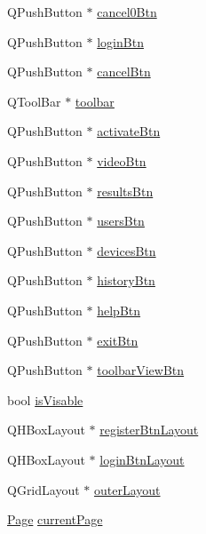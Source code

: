\begin{DoxyCompactItemize}
Q\-Push\-Button $\ast$ \hyperlink{class_master_gui_a591bdee9c01349808ce30a1f1478b99f}{cancel0\-Btn}
\item 
Q\-Push\-Button $\ast$ \hyperlink{class_master_gui_a5bc5b77413591b0b8fb9021062982ca3}{login\-Btn}
\item 
Q\-Push\-Button $\ast$ \hyperlink{class_master_gui_a9203da9daf3fa1294c744bc7fa645115}{cancel\-Btn}
\item 
Q\-Tool\-Bar $\ast$ \hyperlink{class_master_gui_a6851c8e7db4c00bf92b68e10409972f2}{toolbar}
\item 
Q\-Push\-Button $\ast$ \hyperlink{class_master_gui_a0916c489aa00b9e79a617ada5f2339b9}{activate\-Btn}
\item 
Q\-Push\-Button $\ast$ \hyperlink{class_master_gui_ab9232b4e6cf41eec9f72fbd2157b231d}{video\-Btn}
\item 
Q\-Push\-Button $\ast$ \hyperlink{class_master_gui_a09730feb7f21ecd4f3b279056afdb429}{results\-Btn}
\item 
Q\-Push\-Button $\ast$ \hyperlink{class_master_gui_ae6e5539441bee1507155d259ec0cf766}{users\-Btn}
\item 
Q\-Push\-Button $\ast$ \hyperlink{class_master_gui_aca061165f3d6014b7c95052a1bf861f1}{devices\-Btn}
\item 
Q\-Push\-Button $\ast$ \hyperlink{class_master_gui_ac1e5c7696dd0b13ba583acc051e25b6f}{history\-Btn}
\item 
Q\-Push\-Button $\ast$ \hyperlink{class_master_gui_a59bf409f8bf08712d2579c6df986e486}{help\-Btn}
\item 
Q\-Push\-Button $\ast$ \hyperlink{class_master_gui_a4e0b56183c617fa1006c70bda4f01acb}{exit\-Btn}
\item 
Q\-Push\-Button $\ast$ \hyperlink{class_master_gui_a4fa8c1b03f48b75cad73d56e47ec5271}{toolbar\-View\-Btn}
\item 
bool \hyperlink{class_master_gui_af333eea410d23010b21377518a336c04}{is\-Visable}
\item 
Q\-H\-Box\-Layout $\ast$ \hyperlink{class_master_gui_a4b34838acdd8c752614c7f17e64bac75}{register\-Btn\-Layout}
\item 
Q\-H\-Box\-Layout $\ast$ \hyperlink{class_master_gui_a719e8687a4a4522f1c1a2cb24a9808f4}{login\-Btn\-Layout}
\item 
Q\-Grid\-Layout $\ast$ \hyperlink{class_master_gui_a172c1c5883371ed37f0cf1232eb2411a}{outer\-Layout}
\item 
\hyperlink{class_master_gui_af69d22eb6d94d0c4f1291814e56f3d9f}{Page} \hyperlink{class_master_gui_a6f8f7e9a34c58c739f527c80ce42fcac}{current\-Page}
\end{DoxyCompactItemize}


